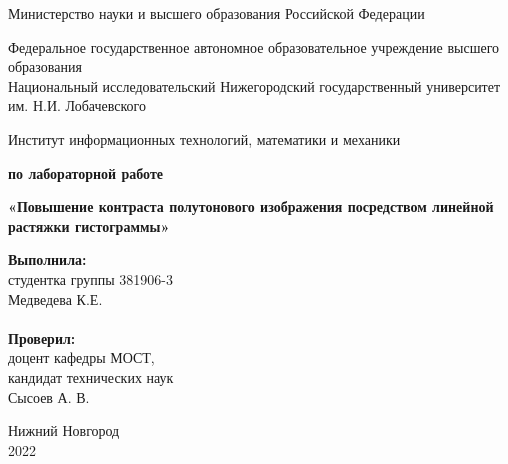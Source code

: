 \documentclass{report}
\begin{document}
\begin{titlepage}

\begin{center}
Министерство науки и высшего образования Российской Федерации
\end{center}

\begin{center}
Федеральное государственное автономное образовательное учреждение высшего образования \\
Национальный исследовательский Нижегородский государственный университет им. Н.И. Лобачевского
\end{center}

\begin{center}
Институт информационных технологий, математики и механики
\end{center}

\vspace{4em}

\begin{center}
\textbf{ по лабораторной работе} \\
\end{center}
\begin{center}
\textbf{\Large«Повышение контраста полутонового изображения посредством линейной растяжки гистограммы»} \\
\end{center}

\vspace{4em}

\newbox{\lbox}
\newlength{\maxl}
\setlength{\maxl}{\wd\lbox}
\hfill\parbox{7cm}{
\hspace*{5cm}\hspace*{-5cm}\textbf{Выполнила:} \\ студентка группы 381906-3 \\ Медведева К.Е.\\
\\
\hspace*{5cm}\hspace*{-5cm}\textbf{Проверил:}\\ доцент кафедры МОСТ, \\ кандидат технических наук \\ Сысоев А. В.\\
}
\vspace{\fill}

\begin{center} Нижний Новгород \\ 2022 \end{center}

\end{titlepage}
\end{document}
